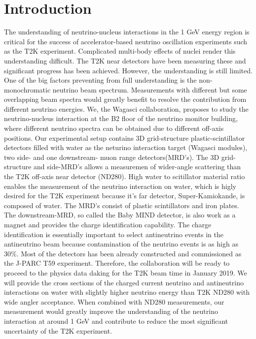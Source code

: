 \section{Introduction}

The understanding of neutrino-nucleus interactions in the 1 GeV energy region is critical for the success
of accelerator-based neutrino oscillation experiments such as the T2K experiment.
Complicated multi-body effects of nuclei render this understanding difficult.
The T2K near detectors have been measuring these and significant progress has been achieved.
However, the understanding is still limited.
One of the big factors preventing from full understanding is the non-monochromatic
neutrino beam spectrum.
Measurements with different but some overlapping beam spectra would greatly benefit to resolve the contribution
from different neutrino energies.
We, the Wagasci collaboration, proposes to study the neutrino-nucleus interaction
at the B2 floor of the neutrino monitor building, where different neutrino spectra
can be obtained due to different off-axis positions.
Our experimental setup contains 3D grid-structure plastic-scintillator detectors filled with water as the neturino interaction target
(Wagasci modules), two side- and one downstream- muon range detectors(MRD's).
The 3D grid-structure and side-MRD's allows a measuremen of  wider-angle scattering than the T2K off-axis near detector (ND280).
High water to scitillator material ratio enables the measurement of the neutrino interaction on water, which
is higly desired for the T2K experiment because it's far detector, Super-Kamiokande, is composed of water.
The MRD's consist of plastic scintillators and iron plates.
The downstream-MRD, so called the Baby MIND detector, is also work as a magnet and provides the charge identification capability.
The charge identification is essentially important to select antineutrino events in the antineutrino beam
because contamination of the neutrino events is as high as 30\%.
Most of the detectors has been already constructed and commissioned as the J-PARC T59 experiment.
Therefore, the collaboration will be ready to proceed to the physics data daking for the T2K beam time in January 2019.
We will provide the cross sections of the charged current neutrino and antineutrino interactions on water
with slightly higher neutrino energy than T2K ND280 with wide angler acceptance.
When combined with ND280 measurements, our measurement would greatly improve the understanding of the neutrino interaction
at around 1 GeV and contribute to reduce the most significant uncertainty of the T2K experiment.
